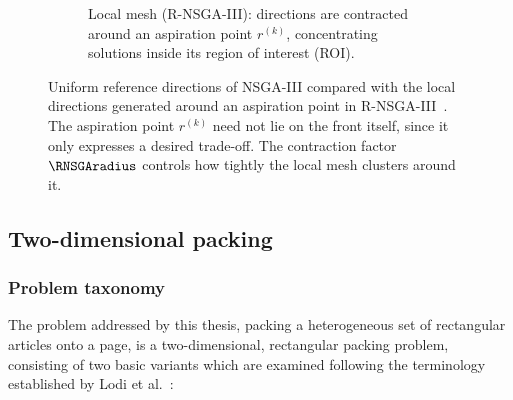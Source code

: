 \begin{figure}[htbp]
\begin{subfigure}{0.48\textwidth}
        \caption{Local mesh (R-NSGA-III): directions are contracted around an aspiration point $r^{(k)}$, concentrating solutions inside its region of interest (ROI).}
        \label{fig:sota-aspiration-points-b}
    \end{subfigure}
    \caption{Uniform reference directions of NSGA-III compared with the local directions generated around an aspiration point in R-NSGA-III~\protect\cite{rnsga-iii}. The aspiration point $r^{(k)}$ need not lie on the front itself, since it only expresses a desired trade-off. The contraction factor $\RNSGAradius$ controls how tightly the local mesh clusters around it.}
    \label{fig:sota-aspiration-points}
\end{figure}

\subsection{Two-dimensional packing}
\label{sec:sota-packing}

\subsubsection{Problem taxonomy}
\label{sec:sota-packing-taxonomy}

The problem addressed by this thesis, packing a heterogeneous set of rectangular articles onto a page, is a two-dimensional, rectangular packing problem, consisting of two basic variants which are examined following the terminology established by Lodi et al.~\cite{lodi-packing-survey}:


